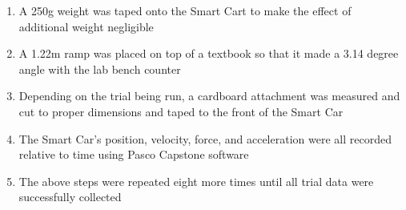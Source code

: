 \begin{enumerate}
    \item A 250g weight was taped onto the Smart Cart to make the effect of additional weight negligible
    \item A 1.22m ramp was placed on top of a textbook so that it made a 3.14 degree angle with the lab bench counter
    \item Depending on the trial being run, a cardboard attachment was measured and cut to proper dimensions and taped to the front of the Smart Car
    \item The Smart Car's position, velocity, force, and acceleration were all recorded relative to time using Pasco Capstone software
    \item The above steps were repeated eight more times until all trial data were successfully collected
\end{enumerate}
